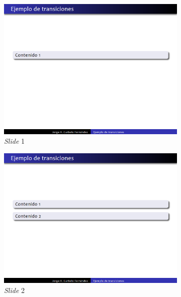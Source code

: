  		\begin{figure}[tb]
 			\centering
 			\begin{subfigure}[b]{0.3\textwidth}
 				\includegraphics[width=\textwidth]{img/content1}
 				\caption{\textit{Slide} 1}
 				\label{fig:contents_a}	
 			\end{subfigure}
 			\hspace*{\fill}
 			\begin{subfigure}[b]{0.3\textwidth}
 				\includegraphics[width=\textwidth]{img/content2}
 				\caption{\textit{Slide} 2}
 				\label{fig:contents_b}	
 			\end{subfigure}
 			\hspace*{\fill}
 			\begin{subfigure}[b]{0.3\textwidth}

\end{subfigure}
\end{figure}
